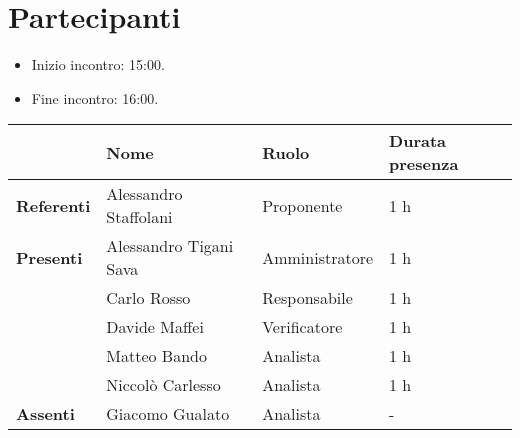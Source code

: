 \section*{Partecipanti}

\begin{itemize}
	\item Inizio incontro: 15:00.
	\item Fine incontro: 16:00.
\end{itemize}


\begin{center}
	{\renewcommand{\arraystretch}{1.5}
		\begin{tabular}{l|lll}
			                   & \textbf{Nome}          & \textbf{Ruolo} & \textbf{Durata presenza} \\
			\hline
			\textbf{Referenti} & Alessandro Staffolani  & Proponente     & 1 h                      \\
			\hline
			\textbf{Presenti}  & Alessandro Tigani Sava & Amministratore & 1 h                      \\
			                   & Carlo Rosso            & Responsabile   & 1 h                      \\
			                   & Davide Maffei          & Verificatore   & 1 h                      \\
			                   & Matteo Bando           & Analista       & 1 h                      \\
			                   & Niccolò Carlesso       & Analista       & 1 h                      \\
			\hline
			\textbf{Assenti}   & Giacomo Gualato        & Analista       & -                        \\
		\end{tabular}
	}
\end{center}
